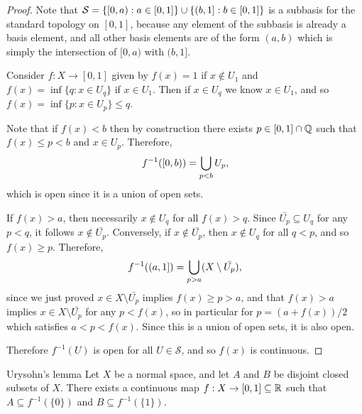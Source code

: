 \begin{proof}
    Note that $\mathcal{S} = \{[0, a) : a \in [0, 1]\} \cup \{(b, 1] : b \in [0, 1]\}$ is a subbasis for the standard topology on $[0, 1]$, because any element of the subbasis is already a basis element, and all other basis elements are of the form $(a, b)$ which is simply the intersection of $[0, a)$ with $(b, 1]$.

    Consider $f: X \to [0, 1]$ given by $f(x) = 1$ if $x \not\in U_1$ and $f(x) = \inf \{q : x \in U_q\}$ if $x \in U_1$. Then if $x \in U_q$ we know $x\in U_1$, and so $f(x) = \inf \{p : x \in U_p\} \leq q$.

    Note that if $f(x) < b$ then by construction there exists $p \in [0, 1] \cap \mathbb{Q}$ such that $f(x) \leq p < b$ and $x \in U_p$. Therefore,
    \begin{align*}
        f^{-1}([0, b)) = \bigcup_{p < b}U_p,
    \end{align*}
    which is open since it is a union of open sets.

    If $f(x) > a$, then necessarily $x \not\in U_q$ for all $f(x) > q$. Since $\bar{U_p} \subseteq U_q$ for any $p < q$, it follows $x \not\in \bar{U_p}$. Conversely, if $x \not\in \bar{U_p}$, then $x \not\in U_q$ for all $q < p$, and so $f(x) \geq p$. Therefore,
    \begin{align*}
        f^{-1}((a, 1]) = \bigcup_{p > a}(X \setminus \bar{U_p}),
    \end{align*}
    since we just proved $x \in X \setminus \bar{U_p}$ implies $f(x) \geq p > a$, and that $f(x) > a$ implies $x \in X \setminus \bar{U_p}$ for any $p < f(x)$, so in particular for $p = (a + f(x))/2$ which satisfies $a < p < f(x)$. Since this is a union of open sets, it is also open.

    Therefore $f^{-1}(U)$ is open for all $U \in \mathcal{S}$, and so $f(x)$ is continuous.
\end{proof}

\begin{thm}{Urysohn's lemma}\label{lemma:urysohn}\proofbreak
    Let $X$ be a normal space, and let $A$ and $B$ be disjoint closed subsets of $X$. There exists a continuous map $f: X \to [0, 1] \subseteq \mathbb{R}$ such that $A \subseteq f^{-1}(\{0\})$ and $B \subseteq f^{-1}(\{1\})$.
\end{thm}

